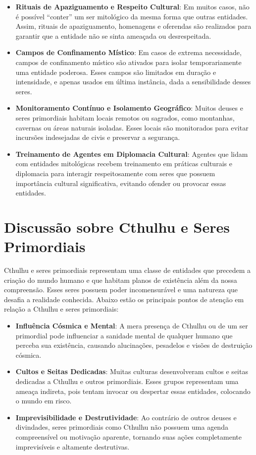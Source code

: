 \begin{itemize}
    \item \textbf{Rituais de Apaziguamento e Respeito Cultural}: Em muitos casos, não é possível “conter” um ser mitológico da mesma forma que outras entidades. Assim, rituais de apaziguamento, homenagens e oferendas são realizados para garantir que a entidade não se sinta ameaçada ou desrespeitada.
    \item \textbf{Campos de Confinamento Místico}: Em casos de extrema necessidade, campos de confinamento místico são ativados para isolar temporariamente uma entidade poderosa. Esses campos são limitados em duração e intensidade, e apenas usados em última instância, dada a sensibilidade desses seres.
    \item \textbf{Monitoramento Contínuo e Isolamento Geográfico}: Muitos deuses e seres primordiais habitam locais remotos ou sagrados, como montanhas, cavernas ou áreas naturais isoladas. Esses locais são monitorados para evitar incursões indesejadas de civis e preservar a segurança.
    \item \textbf{Treinamento de Agentes em Diplomacia Cultural}: Agentes que lidam com entidades mitológicas recebem treinamento em práticas culturais e diplomacia para interagir respeitosamente com seres que possuem importância cultural significativa, evitando ofender ou provocar essas entidades.
\end{itemize}

\section{Discussão sobre Cthulhu e Seres Primordiais}
Cthulhu e seres primordiais representam uma classe de entidades que precedem a criação do mundo humano e que habitam planos de existência além da nossa compreensão. Esses seres possuem poder incomensurável e uma natureza que desafia a realidade conhecida. Abaixo estão os principais pontos de atenção em relação a Cthulhu e seres primordiais:

\begin{itemize}
    \item \textbf{Influência Cósmica e Mental}: A mera presença de Cthulhu ou de um ser primordial pode influenciar a sanidade mental de qualquer humano que perceba sua existência, causando alucinações, pesadelos e visões de destruição cósmica.
    \item \textbf{Cultos e Seitas Dedicadas}: Muitas culturas desenvolveram cultos e seitas dedicadas a Cthulhu e outros primordiais. Esses grupos representam uma ameaça indireta, pois tentam invocar ou despertar essas entidades, colocando o mundo em risco.
    \item \textbf{Imprevisibilidade e Destrutividade}: Ao contrário de outros deuses e divindades, seres primordiais como Cthulhu não possuem uma agenda compreensível ou motivação aparente, tornando suas ações completamente imprevisíveis e altamente destrutivas.
\end{itemize}

